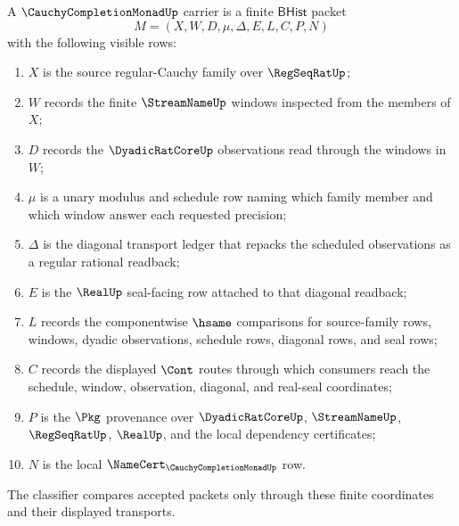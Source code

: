 \begin{definition}
\label{def:cauchy-completion-monad-carrier}
A $\CauchyCompletionMonadUp$ carrier is a finite $\mathsf{BHist}$ packet
$$
M=(X,W,D,\mu,\Delta,E,L,C,P,N)
$$
with the following visible rows:
\begin{enumerate}
\item $X$ is the source regular-Cauchy family over $\RegSeqRatUp$;
\item $W$ records the finite $\StreamNameUp$ windows inspected from the members of $X$;
\item $D$ records the $\DyadicRatCoreUp$ observations read through the windows in $W$;
\item $\mu$ is a unary modulus and schedule row naming which family member and which window answer each requested precision;
\item $\Delta$ is the diagonal transport ledger that repacks the scheduled observations as a regular rational readback;
\item $E$ is the $\RealUp$ seal-facing row attached to that diagonal readback;
\item $L$ records the componentwise $\hsame$ comparisons for source-family rows, windows, dyadic observations, schedule rows, diagonal rows, and seal rows;
\item $C$ records the displayed $\Cont$ routes through which consumers reach the schedule, window, observation, diagonal, and real-seal coordinates;
\item $P$ is the $\Pkg$ provenance over $\DyadicRatCoreUp$, $\StreamNameUp$, $\RegSeqRatUp$, $\RealUp$, and the local dependency certificates;
\item $N$ is the local $\NameCert_{\CauchyCompletionMonadUp}$ row.
\end{enumerate}
The classifier compares accepted packets only through these finite coordinates and their displayed transports.
\end{definition}

